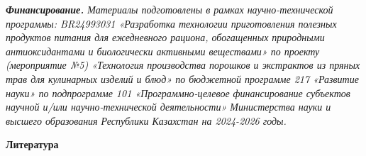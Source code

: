 \begin{multicols}{2}
\emph{{\bfseries Финансирование.} Материалы подготовлены в рамках
научно-технической программы: BR24993031 «Разработка технологии
приготовления полезных продуктов питания для ежедневного рациона,
обогащенных природными антиоксидантами и биологически активными
веществами» по проекту (мероприятие №5) «Технология производства
порошков и экстрактов из пряных трав для кулинарных изделий и блюд» по
бюджетной программе 217 «Развитие науки» по подпрограмме 101
«Программно-целевое финансирование субъектов научной и/или
научно-технической деятельности» Министерства науки и высшего
образования Республики Казахстан на 2024-2026 годы.}
\end{multicols}

\begin{center}
{\bfseries Литература}
\end{center}

